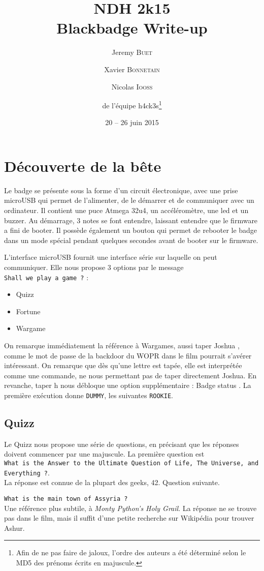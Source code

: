 \documentclass[11pt]{article}
\title{NDH 2k15\\Blackbadge Write-up}
\author{Jeremy \textsc{Buet}\and Xavier \textsc{Bonnetain}\and Nicolas \textsc{Iooss}\and de l'équipe h4ck3s\footnote{Afin de ne pas faire de jaloux, l'ordre des auteurs a été déterminé selon le MD5 des prénoms écrits en majuscule.}}
\date{20 -- 26 juin 2015}
\newcommand{\ttt}[1]{\texttt{#1}}
\begin{document}
\maketitle

\section{Découverte de la bête}
    Le badge se présente sous la forme d'un circuit électronique, avec une prise microUSB qui permet de l'alimenter, de le démarrer et de communiquer avec un ordinateur. Il contient une puce Atmega 32u4, un accéléromètre, une led et un buzzer. Au démarrage, 3 notes se font entendre, laissant entendre que le firmware a fini de booter. Il possède également un bouton qui permet de rebooter le badge dans un mode spécial pendant quelques secondes avant de booter sur le firmware.

    L'interface microUSB fournit une interface série sur laquelle on peut communiquer. Elle nous propose 3 options par le message \\\og \ttt{Shall we play a game ?} \fg :
    \begin{itemize}
    \ttfamily
    \item Quizz
    \item Fortune
    \item Wargame
    \end{itemize}

    On remarque immédiatement la référence à Wargames, aussi taper \og Joshua \fg , comme le mot de passe de la backdoor du WOPR dans le film pourrait s'avérer intéressant. On remarque que dès qu'une lettre est tapée, elle est interprétée comme une commande, ne nous permettant pas de taper directement Joshua. En revanche, taper \og h \fg{}  nous débloque une option supplémentaire : \og Badge status \fg . La première exécution donne \ttt{DUMMY}, les suivantes \ttt{ROOKIE}.
      \newpage
    \subsection{Quizz}
    Le Quizz nous propose une série de questions, en précisant que les réponses doivent commencer par une majuscule. La première question est \\ \ttt{What is the Answer to the Ultimate Question of Life, The Universe, and Everything ?}.\\
    La réponse est connue de la plupart des geeks, 42. Question suivante.

    \ttt{What is the main town of Assyria ?}\\
    Une référence plus subtile, à \emph{Monty Python's Holy Grail}. La réponse ne se trouve pas dans le film, mais il suffit d'une petite recherche sur Wikipédia pour trouver Ashur.
\end{document}
